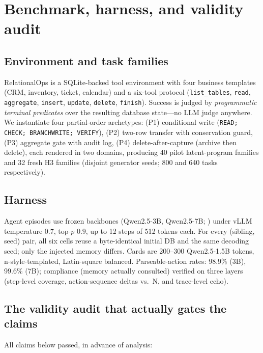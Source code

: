 \section{Benchmark, harness, and validity audit}
\label{sec:setup}

\subsection{Environment and task families}

RelationalOps is a SQLite-backed tool environment with four business templates (CRM, inventory, ticket, calendar) and a six-tool protocol (\texttt{list\_tables}, \texttt{read}, \texttt{aggregate}, \texttt{insert}, \texttt{update}, \texttt{delete}, \texttt{finish}). Success is judged by \emph{programmatic terminal predicates} over the resulting database state---no LLM judge anywhere. We instantiate four partial-order archetypes: (P1) conditional write (\texttt{READ; CHECK; BRANCHWRITE; VERIFY}), (P2) two-row transfer with conservation guard, (P3) aggregate gate with audit log, (P4) delete-after-capture (archive then delete), each rendered in two domains, producing 40 pilot latent-program families and 32 fresh H3 families (disjoint generator seeds; 800 and 640 tasks respectively).

\subsection{Harness}

Agent episodes use frozen backbones (Qwen2.5-3B, Qwen2.5-7B; \citealp{qwen2025}) under vLLM temperature $0.7$, top-$p$ $0.9$, up to 12 steps of 512 tokens each. For every (sibling, seed) pair, all six cells reuse a byte-identical initial DB and the same decoding seed; only the injected memory differs. Cards are 200–300 Qwen2.5-1.5B tokens, n-style-templated, Latin-square balanced. Parseable-action rates: 98.9\% (3B), 99.6\% (7B); compliance (memory actually consulted) verified on three layers (step-level coverage, action-sequence deltas vs.\ N, and trace-level echo).

\subsection{The validity audit that actually gates the claims}
\label{ssec:audit}

All claims below passed, in advance of analysis:

